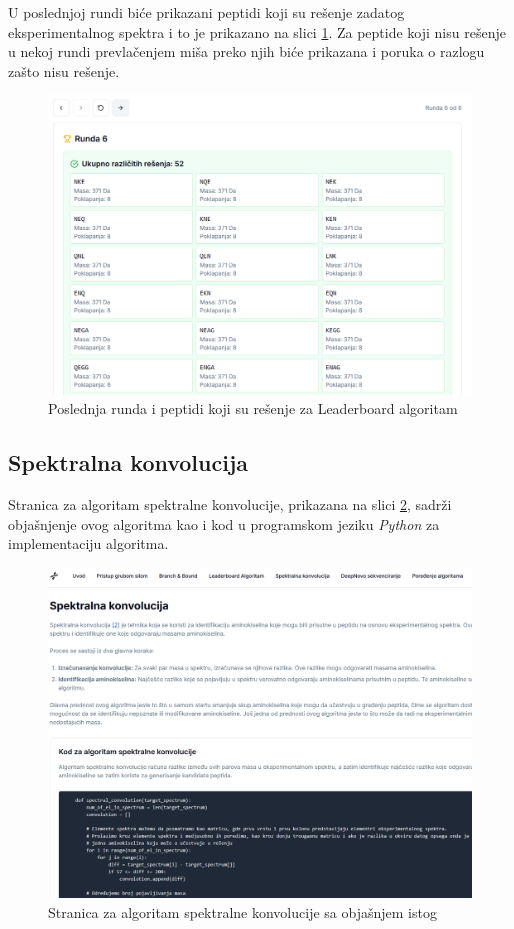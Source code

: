 \documentclass[12pt,oneside]{memoir}
\begin{document}
U poslednjoj rundi biće prikazani peptidi koji su rešenje zadatog eksperimentalnog spektra i to je prikazano na slici \ref{fig:leaderboard_3}. Za peptide koji nisu rešenje u nekoj rundi prevlačenjem miša preko njih biće prikazana i poruka o razlogu zašto nisu rešenje.
\begin{figure}[H]
\centering
\includegraphics[width=1\textwidth]{images/leaderboard_3.png}
\caption{Poslednja runda i peptidi koji su rešenje za Leaderboard algoritam}
\label{fig:leaderboard_3}
\end{figure}

\subsection{Spektralna konvolucija}
Stranica za algoritam spektralne konvolucije, prikazana na slici \ref{fig:convolution_1}, sadrži objašnjenje ovog algoritma kao i kod u programskom jeziku \emph{Python} za implementaciju algoritma.
\begin{figure}[H]
\centering
\includegraphics[width=1\textwidth]{images/convolution_1.png}
\caption{Stranica za algoritam spektralne konvolucije sa objašnjem istog}
\label{fig:convolution_1}
\end{figure}
\end{document}
